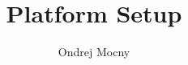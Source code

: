 \documentclass[12pt, a4paper]{article}
\begin{document}
\title{Platform Setup}
\author{Ondrej Mocny}
\maketitle

\tableofcontents

\newpage


\end{document}
